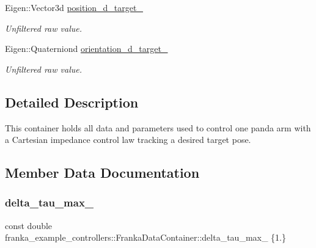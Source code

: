 \begin{DoxyCompactItemize}
Eigen\+::\+Vector3d \hyperlink{structfranka__example__controllers_1_1_franka_data_container_a7ef83945560a2b6cf9633fee007c7144}{position\+\_\+d\+\_\+target\+\_\+}
\begin{DoxyCompactList}\small\item\em Unfiltered raw value. \end{DoxyCompactList}\item 
\mbox{\label{structfranka__example__controllers_1_1_franka_data_container_aae8a663d2e5a36dd1d30079880f06308}} 
Eigen\+::\+Quaterniond \hyperlink{structfranka__example__controllers_1_1_franka_data_container_aae8a663d2e5a36dd1d30079880f06308}{orientation\+\_\+d\+\_\+target\+\_\+}
\begin{DoxyCompactList}\small\item\em Unfiltered raw value. \end{DoxyCompactList}\end{DoxyCompactItemize}


\subsection{Detailed Description}
This container holds all data and parameters used to control one panda arm with a Cartesian impedance control law tracking a desired target pose. 

\subsection{Member Data Documentation}
\mbox{\label{structfranka__example__controllers_1_1_franka_data_container_aef62faa01b4a183eb5a4e610282515c1}} 
\subsubsection{\texorpdfstring{delta\+\_\+tau\+\_\+max\+\_\+}{delta\_tau\_max\_}}
{\footnotesize\ttfamily const double franka\+\_\+example\+\_\+controllers\+::\+Franka\+Data\+Container\+::delta\+\_\+tau\+\_\+max\+\_\+ \{1.\}}

